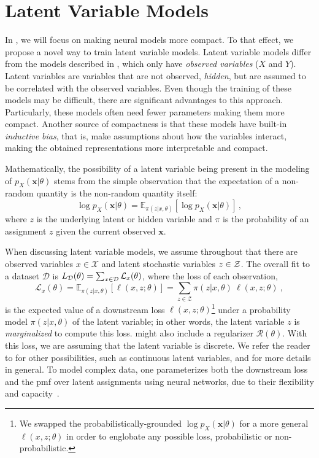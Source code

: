 \section{Latent Variable Models}
\label{sec:lvm}

\noindent In , we will focus on making neural models
more compact. To that effect, we propose a novel way to train latent
variable models. Latent variable models differ from the models
described in , which only have \textit{observed
        variables} ($X$ and $Y$). Latent variables are variables that are not
observed, \ie \textit{hidden}, but are assumed to be correlated with
the observed variables. Even though the training of these models
may be difficult, there are significant advantages to this approach.
Particularly, these models often need fewer parameters making them more compact.
Another source of compactness is that these models
have built-in \textit{inductive bias}, that is,
make assumptions about how the variables interact, making the obtained
representations more interpretable and compact.

Mathematically, the possibility of a latent variable being present
in the modeling of $p_X(\bm{x}|\theta)$ stems from the simple
observation that the expectation of a non-random quantity is the non-random quantity itself:
%
\begin{equation}\label{eq:lvm}
        \log p_X(\bm{x}|\theta) =
        \mathbb{E}_{\pi(z | x, \theta)} \left[\log p_X(\bm{x}|\theta)\right]\,,
\end{equation}
%
where $z$ is the underlying latent or hidden variable and $\pi$ is the
probability of an assignment $z$ given the current observed $\bm{x}$.

When discussing latent variable models, we assume throughout that there are observed variables
$x \in \mathcal{X}$ and latent stochastic variables $z \in \mathcal{Z}$. The
overall fit to a dataset $\mathcal D$ is $L_\mathcal{D}(\theta) =
        \sum_{x \in \mathcal{D}} \mathcal{L}_x(\theta)$, where the loss of each
observation,
%
\begin{equation}\label{eq:fit}
        \mathcal{L}_{x}(\theta) =
        \mathbb E_{\pi(z|x, \theta)}
        \left[ \ell(x, z; \theta)\right] =
        \sum_{z \in \mathcal Z} \pi(z | x, \theta)~\ell(x, z; \theta) ~,
\end{equation}
%
is the expected value of a downstream loss $\ell(x,z;\theta)$\footnote{
        We swapped the probabilistically-grounded $\log p_X(\bm{x}|\theta)$
        for a more general $\ell(x,z;\theta)$ in order
        to englobate any possible loss, probabilistic or non-probabilistic.
}
under a
probability model $\pi(z|x,\theta)$ of the latent variable; in other
words, the latent variable $z$ is {\it marginalized} to compute this loss.
 might also include a regularizer $\mathcal{R}(\theta)$.
With this loss, we are assuming that the latent variable is discrete. We refer the reader
to \citet{Kim2018} for other possibilities, such as continuous latent variables, and for more
details in general.
To model complex data, one parameterizes both the downstream loss and
the pmf over latent assignments using neural networks, due
to their flexibility and capacity~\citep{Kingma+2014:VAE}.


